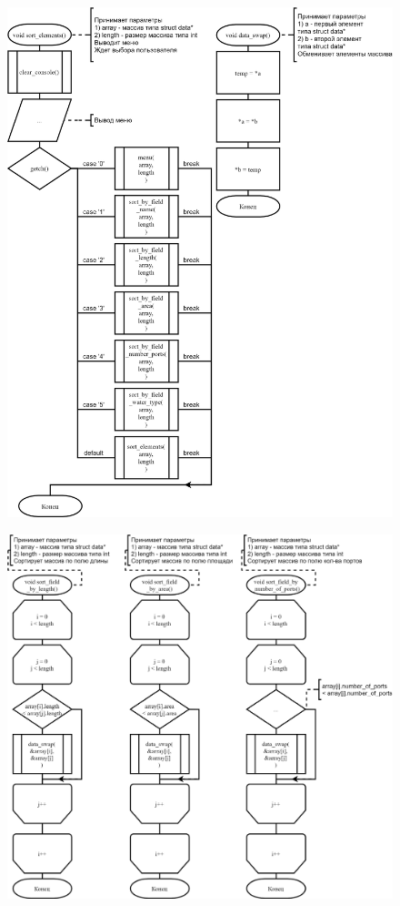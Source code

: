 \begin{figure}[!htp]
    \includegraphics[width=17cm]{../src/submenu/sort_elements/sort_elements-1.png}
\end{figure}
\begin{figure}[!htp]
    \includegraphics[width=17cm]{../src/submenu/sort_elements/sort_elements-2.png}
\end{figure}
